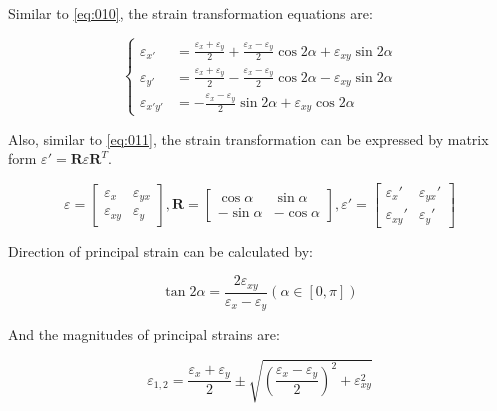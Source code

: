 \documentclass[en,hazy,cyan,8pt,normal]{elegantnote}
\numberwithin{equation}{section}
\begin{document}
  Similar to \cref{eq:010}, the strain transformation equations are:

  \begin{equation}\label{eq:044}
    \left\{
    \begin{aligned}
      \varepsilon_{x'}&=\frac{\varepsilon_x+\varepsilon_y}{2}+\frac{\varepsilon_x-\varepsilon_y}{2}\cos2\alpha+\varepsilon_{xy}\sin2\alpha\\
      \varepsilon_{y'}&=\frac{\varepsilon_x+\varepsilon_y}{2}-\frac{\varepsilon_x-\varepsilon_y}{2}\cos2\alpha-\varepsilon_{xy}\sin2\alpha\\
      \varepsilon_{x'y'}&=-\frac{\varepsilon_x-\varepsilon_y}{2}\sin2\alpha+\varepsilon_{xy}\cos2\alpha
    \end{aligned}
    \right.
  \end{equation}

  Also, similar to \cref{eq:011}, the strain transformation can be expressed by matrix form $\varepsilon' = \mathbf{R} \varepsilon \mathbf{R}^T$.

  \begin{equation}\label{eq:045}
    \varepsilon=
    \begin{bmatrix}
      \varepsilon_x & \varepsilon_{yx}\\
      \varepsilon_{xy} & \varepsilon_y
    \end{bmatrix}, 
    \mathbf{R}=
    \begin{bmatrix}
      \cos\alpha & \sin\alpha\\
      -\sin\alpha & -\cos\alpha
    \end{bmatrix},
    \varepsilon'=
    \begin{bmatrix}
      \varepsilon_x' & \varepsilon_{yx}'\\
      \varepsilon_{xy}' & \varepsilon_y'
    \end{bmatrix}
  \end{equation}

  Direction of principal strain can be calculated by:

  \begin{equation}\label{eq:046}
    \tan2\alpha=\frac{2\varepsilon_{xy}}{\varepsilon_x-\varepsilon_y}(\alpha\in[0,\pi])
  \end{equation}

  And the magnitudes of principal strains are:

  \begin{equation}\label{eq:047}
    \varepsilon_{1,2}=\frac{\varepsilon_x+\varepsilon_y}{2} \pm \sqrt{\left(\frac{\varepsilon_x-\varepsilon_y}{2}\right)^2+\varepsilon_{xy}^2}
  \end{equation}
\end{document}
